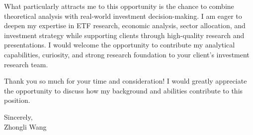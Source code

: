 \documentclass[11pt]{article}
\begin{document}
What particularly attracts me to this opportunity is the chance to combine theoretical analysis with real-world investment decision-making. I am eager to deepen my expertise in ETF research, economic analysis, sector allocation, and investment strategy while supporting clients through high-quality research and presentations. I would welcome the opportunity to contribute my analytical capabilities, curiosity, and strong research foundation to your client's investment research team.

Thank you so much for your time and consideration! I would greatly appreciate the opportunity to discuss how my background and abilities contribute to this position. 

\vspace{0.15cm}
\noindent Sincerely, \\[0.5cm]
\noindent Zhongli Wang
\end{document}
